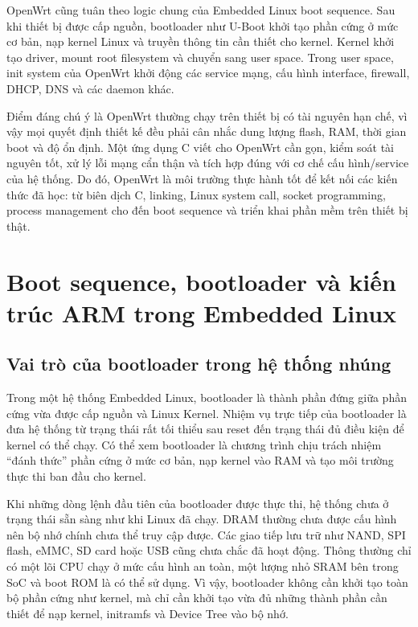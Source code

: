 \documentclass[11pt]{article}
\begin{document}
OpenWrt cũng tuân theo logic chung của Embedded Linux boot sequence. Sau khi thiết bị được cấp nguồn, bootloader như U-Boot khởi tạo phần cứng ở mức cơ bản, nạp kernel Linux và truyền thông tin cần thiết cho kernel. Kernel khởi tạo driver, mount root filesystem và chuyển sang user space. Trong user space, init system của OpenWrt khởi động các service mạng, cấu hình interface, firewall, DHCP, DNS và các daemon khác.

Điểm đáng chú ý là OpenWrt thường chạy trên thiết bị có tài nguyên hạn chế, vì vậy mọi quyết định thiết kế đều phải cân nhắc dung lượng flash, RAM, thời gian boot và độ ổn định. Một ứng dụng C viết cho OpenWrt cần gọn, kiểm soát tài nguyên tốt, xử lý lỗi mạng cẩn thận và tích hợp đúng với cơ chế cấu hình/service của hệ thống. Do đó, OpenWrt là môi trường thực hành tốt để kết nối các kiến thức đã học: từ biên dịch C, linking, Linux system call, socket programming, process management cho đến boot sequence và triển khai phần mềm trên thiết bị thật.

\section{Boot sequence, bootloader và kiến trúc ARM trong Embedded Linux}

\subsection{Vai trò của bootloader trong hệ thống nhúng}

Trong một hệ thống Embedded Linux, bootloader là thành phần đứng giữa phần cứng vừa được cấp nguồn và Linux Kernel. Nhiệm vụ trực tiếp của bootloader là đưa hệ thống từ trạng thái rất tối thiểu sau reset đến trạng thái đủ điều kiện để kernel có thể chạy. Có thể xem bootloader là chương trình chịu trách nhiệm ``đánh thức'' phần cứng ở mức cơ bản, nạp kernel vào RAM và tạo môi trường thực thi ban đầu cho kernel.

Khi những dòng lệnh đầu tiên của bootloader được thực thi, hệ thống chưa ở trạng thái sẵn sàng như khi Linux đã chạy. DRAM thường chưa được cấu hình nên bộ nhớ chính chưa thể truy cập được. Các giao tiếp lưu trữ như NAND, SPI flash, eMMC, SD card hoặc USB cũng chưa chắc đã hoạt động. Thông thường chỉ có một lõi CPU chạy ở mức cấu hình an toàn, một lượng nhỏ SRAM bên trong SoC và boot ROM là có thể sử dụng. Vì vậy, bootloader không cần khởi tạo toàn bộ phần cứng như kernel, mà chỉ cần khởi tạo vừa đủ những thành phần cần thiết để nạp kernel, initramfs và Device Tree vào bộ nhớ.
\end{document}
